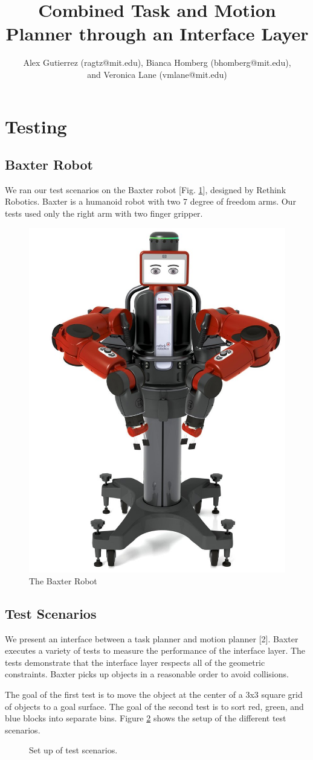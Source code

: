 \documentclass[12pt]{article}
\title{Combined Task and Motion Planner through an Interface Layer}
\author{Alex Gutierrez (ragtz@mit.edu), Bianca Homberg (bhomberg@mit.edu), \\and Veronica Lane (vmlane@mit.edu)}
\begin{document}
\maketitle 


\section{Testing}

\subsection{Baxter Robot}

We ran our test scenarios on the Baxter robot [Fig. \ref{fig:baxter}], designed by Rethink Robotics. 
Baxter is a humanoid robot with two 7 degree of freedom arms. 
Our tests used only the right arm with two finger gripper.

\begin{figure}[h]
\centering
\includegraphics[width=.2\textwidth]{baxter}
\caption{The Baxter Robot \label{fig:baxter}}
\end{figure}

\subsection{Test Scenarios} \label{tests}

We present an interface between a task planner and motion planner [2]. 
Baxter executes a variety of tests to measure the performance of the interface layer. 
The tests demonstrate that the interface layer respects all of the geometric constraints. 
Baxter picks up objects in a reasonable order to avoid collisions.

The goal of the first test is to move the object at the center of a 3x3 square grid of objects to a goal surface. 
The goal of the second test is to sort red, green, and blue blocks into separate bins.
Figure \ref{fig:scenarios} shows the setup of the different test scenarios. 

\begin{figure}[h]
\centering
\def\svgwidth{.4\textwidth}

\caption{Set up of test scenarios.\label{fig:scenarios}}
\end{figure}
\end{document}
